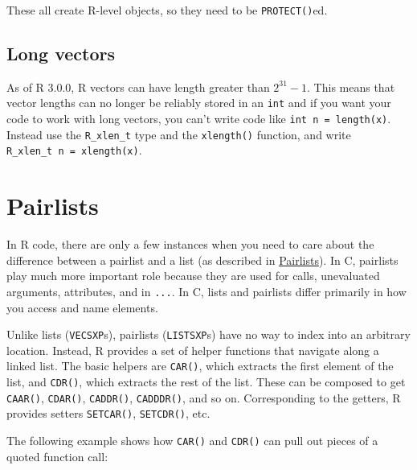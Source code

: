 These all create R-level objects, so they need to be
\texttt{PROTECT()}ed.

\hypertarget{long-vectors}{%
\subsection{Long vectors}\label{long-vectors}}

As of R 3.0.0, R vectors can have length greater than \(2 ^ 31 - 1\).
This means that vector lengths can no longer be reliably stored in an
\texttt{int} and if you want your code to work with long vectors, you
can't write code like \texttt{int\ n\ =\ length(x)}. Instead use the
\texttt{R\_xlen\_t} type and the \texttt{xlength()} function, and write
\texttt{R\_xlen\_t\ n\ =\ xlength(x)}. 

\hypertarget{c-pairlists}{%
\section{Pairlists}\label{c-pairlists}}

In R code, there are only a few instances when you need to care about
the difference between a pairlist and a list (as described in
\protect\hyperlink{pairlists}{Pairlists}). In C, pairlists play much
more important role because they are used for calls, unevaluated
arguments, attributes, and in \texttt{...}. In C, lists and pairlists
differ primarily in how you access and name elements. 

Unlike lists (\texttt{VECSXP}s), pairlists (\texttt{LISTSXP}s) have no
way to index into an arbitrary location. Instead, R provides a set of
helper functions that navigate along a linked list. The basic helpers
are \texttt{CAR()}, which extracts the first element of the list, and
\texttt{CDR()}, which extracts the rest of the list. These can be
composed to get \texttt{CAAR()}, \texttt{CDAR()}, \texttt{CADDR()},
\texttt{CADDDR()}, and so on. Corresponding to the getters, R provides
setters \texttt{SETCAR()}, \texttt{SETCDR()}, etc.

The following example shows how \texttt{CAR()} and \texttt{CDR()} can
pull out pieces of a quoted function call:


